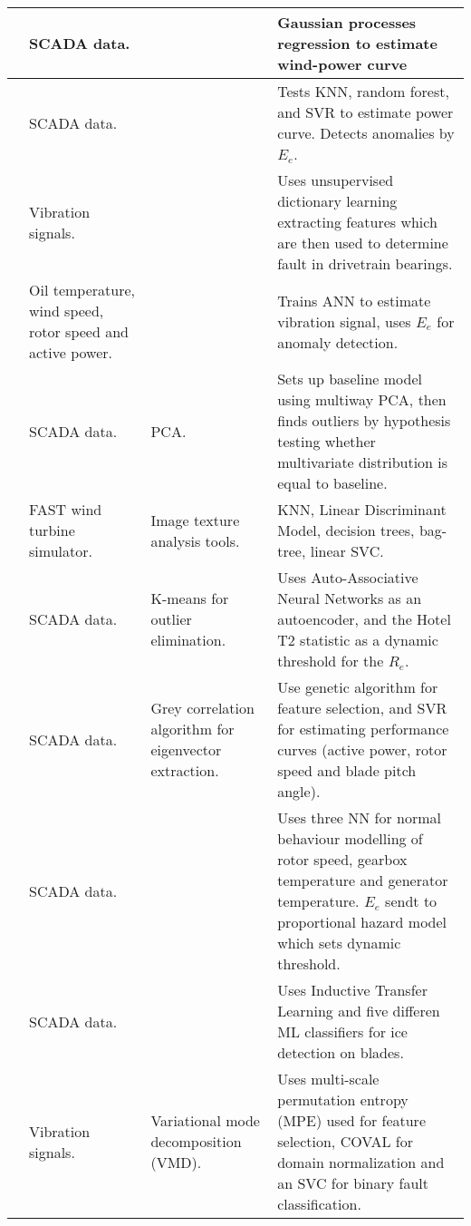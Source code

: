 \begin{longtable}{p{}p{}p{}p{}}
    \cite{GP_operational_curve_monitoring} & SCADA data. & & Gaussian processes regression to estimate wind-power curve \\ \hline
    \cite{high_freq_scada_perf_monit_sensitivity} & SCADA data. & & Tests KNN, random forest, and SVR to estimate power curve. Detects anomalies by $E_e$. \\ \hline
    \cite{dict_learning_monitor_wt_drivetrain_bearing} & Vibration signals. & & Uses unsupervised dictionary learning extracting features which are then used to determine fault in drivetrain bearings. \\ \hline
    \cite{ANN_damage_detection_gearbox_wt} & Oil temperature, wind speed, rotor speed and active power. & & Trains ANN to estimate vibration signal, uses $E_e$ for anomaly detection. \\ \hline
    \cite{multiway_PCA_multivar_inference_cm_wt} & SCADA data. & PCA. & Sets up baseline model using multiway PCA, then finds outliers by hypothesis testing whether multivariate distribution is equal to baseline. \\ \hline
    \cite{image_texture_analysis_FD_wt} & FAST wind turbine simulator. & Image texture analysis tools. & KNN, Linear Discriminant Model, decision trees, bag-tree, linear SVC.\\ \hline
    \cite{auto_associative_nn_wt_fault_detection} & SCADA data. & K-means for outlier elimination. & Uses Auto-Associative Neural Networks as an autoencoder, and the Hotel T2 statistic as a dynamic threshold for the $R_e$.\\ \hline
    \cite{abnormal_detection_scada_data_mining} & SCADA data. & Grey correlation algorithm for eigenvector extraction. & Use genetic algorithm for feature selection, and SVR for estimating performance curves (active power, rotor speed and blade pitch angle). \\ \hline
    \cite{health_cond_model_nn_proportional_hazard_models} & SCADA data. & & Uses three NN for normal behaviour modelling of rotor speed, gearbox temperature and generator temperature. $E_e$ sendt to proportional hazard model which sets dynamic threshold. \\ \hline
    \cite{ice_detection_using_ITL} & SCADA data. & & Uses Inductive Transfer Learning and five differen ML classifiers for ice detection on blades. \\ \hline
    \cite{VMD_MPE_COVAL_fault_detection_gearbox} & Vibration signals. & Variational mode decomposition (VMD). & Uses multi-scale permutation entropy (MPE) used for feature selection, COVAL for domain normalization and an SVC for binary fault classification.\\ \hline

\end{longtable}
